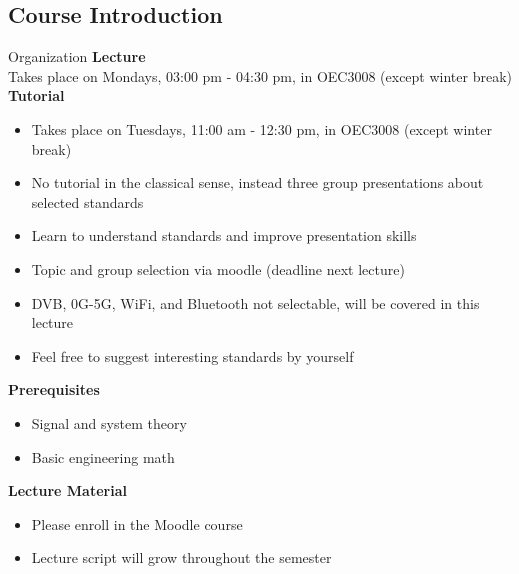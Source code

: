 \subsection{Course Introduction}

\begin{frame}{Organization}
    \textbf{Lecture}\\
    Takes place on Mondays, 03:00 pm - 04:30 pm, in OEC3008 (except winter break)\\\vspace{1.5ex}
    \textbf{Tutorial}
    \begin{itemize}
        \item Takes place on Tuesdays, 11:00 am - 12:30 pm, in OEC3008 (except winter break)
        \item No tutorial in the classical sense, instead three group presentations about selected standards
        \item Learn to understand standards and improve presentation skills
        \item Topic and group selection via moodle (deadline next lecture)
        \item DVB, 0G-5G, WiFi, and Bluetooth not selectable, will be covered in this lecture
        \item Feel free to suggest interesting standards by yourself
    \end{itemize}
    \textbf{Prerequisites}
    \begin{itemize}
        \item Signal and system theory
        \item Basic engineering math
    \end{itemize}
    \textbf{Lecture Material}
    \begin{itemize}
        \item Please enroll in the Moodle course
        \item Lecture script will grow throughout the semester
    \end{itemize}
\end{frame}

